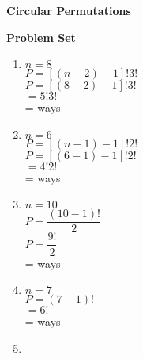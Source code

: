 \begin{center}
\textbf{Circular Permutations}\\
\end{center}

\vspace*{1ex}

\textbf{Problem Set}

\vspce


\begin{enumerate}[label = \arabic*. ]
\item %
$ n= 8$ \redcheck \\
$ P = [(n-2)-1]!3! $ \redcheck \\
$ P = [(8-2)-1]!3! $ \redcheck \\
$ = 5!3! $ \redcheck \\
= \redcheck 
ways \redcheck 

\item %
$ n=6 $ \redcheck \\
$ P = [(n-1)-1]!2! $ \redcheck \\
$ P = [(6-1)-1]!2! $ \redcheck \\
$ = 4!2! $ \redcheck \\
= \redcheck 
ways \redcheck 

\item %
$ n= 10$ \redcheck \\
$ P = \dfrac{(10 -1)!}{2} $ \redcheck \\
$ P = \dfrac{9!}{2} $ \redcheck \\
= \redcheck 
ways \redcheck 

\item %
$ n= 7$ \redcheck \\
$ P = (7-1)! $ \redcheck \\
$ = 6! $ \redcheck \\
= \redcheck 
ways \redcheck 

\item %


\end{enumerate}

